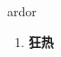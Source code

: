
\begin{frame}
{\huge ardor}
\begin{center}
\begin{enumerate}\Large
  \item \textbf{狂热}
\end{enumerate}
\end{center}
\end{frame}
